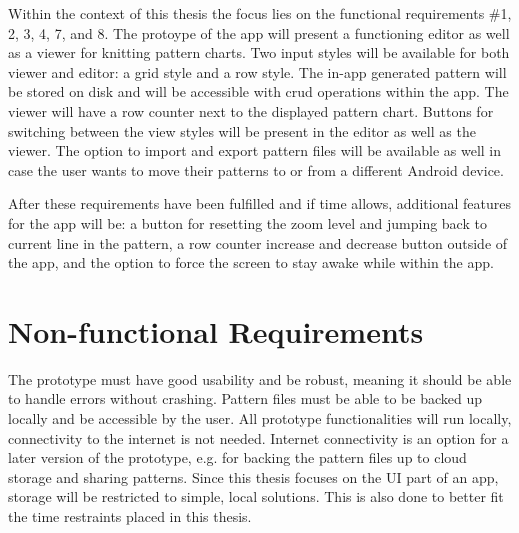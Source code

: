 Within the context of this thesis the focus lies on the functional requirements \#1, 2, 3, 4, 7, and 8. The protoype of the app will present a functioning editor as well as a viewer for knitting pattern charts. Two input styles will be available for both viewer and editor: a grid style and a row style. The in-app generated pattern will be stored on disk and will be accessible with \gls{crud} operations within the app. The viewer will have a row counter next to the displayed pattern chart. Buttons for switching between the view styles will be present in the editor as well as the viewer. The option to import and export pattern files will be available as well in case the user wants to move their patterns to or from a different Android device. 

After these requirements have been fulfilled and if time allows, additional features for the app will be: a button for resetting the zoom level and jumping back to current line in the pattern, a row counter increase and decrease button outside of the app, and the option to force the screen to stay awake while within the app.

\section{Non-functional Requirements}

The prototype must have good usability and be robust, meaning it should be able to handle errors without crashing. Pattern files must be able to be backed up locally and be accessible by the user. All prototype functionalities will run locally, connectivity to the internet is not needed. Internet connectivity is an option for a later version of the prototype, e.g. for backing the pattern files up to cloud storage and sharing patterns. Since this thesis focuses on the \gls{UI} part of an app, storage will be restricted to simple, local solutions. This is also done to better fit the time restraints placed in this thesis. 